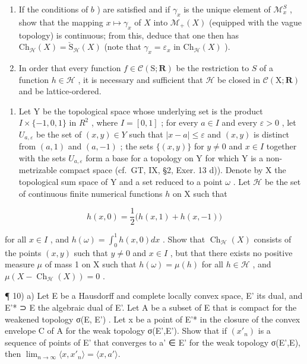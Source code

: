 \begin{enumerate}
\def\labelenumi{\alph{enumi})}
\setcounter{enumi}{2}
\item
  If the conditions of \(b\) ) are satisfied and if \(\gamma_x\) is the unique element of \(\mathcal{M}_x^S\) , show that the mapping \(x \mapsto \gamma_x\) of \(X\) into \(\mathcal{M}_+(X)\) (equipped with the vague topology) is continuous; from this, deduce that one then has \(\mathrm{Ch}_{\mathcal{H}}(X) = \check{\mathrm{S}}_{\mathcal{H}}(X)\) (note that \(\gamma_x = \varepsilon_x\) in \(\mathrm{Ch}_{\mathcal{H}}(X)\) ).
\item
  In order that every function \(f \in \mathcal{C}(\mathrm{S};\mathbf{R})\) be the restriction to \(S\) of a function \(h \in \mathcal{H}\) , it is necessary and sufficient that \(\mathcal{H}\) be closed in \(\mathcal{C}(\mathrm{X};\mathbf{R})\) and be lattice-ordered.
\end{enumerate}

\begin{enumerate}
\def\labelenumi{\arabic{enumi})}
\setcounter{enumi}{8}
\tightlist
\item
  Let Y be the topological space whose underlying set is the product \(I \times \{-1,0,1\}\) in \(R^{2}\) , where \(I = [0,1]\) ; for every \(a \in I\) and every \(\varepsilon > 0\) , let \(U_{a,\varepsilon}\) be the set of \((x,y) \in Y\) such that \(|x - a| \leqslant \varepsilon\) and \((x,y)\) is distinct from \((a,1)\) and \((a,-1)\) ; the sets \(\{(x,y)\}\) for \(y \neq 0\) and \(x \in I\) together with the sets \(U_{a,\varepsilon}\) form a base for a topology on Y for which Y is a non-metrizable compact space (cf.~GT, IX, §2, Exer. 13 d)). Denote by X the topological sum space of Y and a set reduced to a point \(\omega\) . Let \(\mathcal{H}\) be the set of continuous finite numerical functions \(h\) on X such that
\end{enumerate}

\[
h (x, 0) = \frac {1}{2} \bigl (h (x, 1) + h (x, - 1) \bigr)
\]

for all \(x \in I\) , and \(h(\omega) = \int_0^1 h(x, 0) dx\) . Show that \(\operatorname{Ch}_{\mathcal{H}}(X)\) consists of the points \((x, y)\) such that \(y \neq 0\) and \(x \in I\) , but that there exists no positive measure \(\mu\) of mass 1 on X such that \(h(\omega) = \mu(h)\) for all \(h \in \mathcal{H}\) , and \(\mu(X - \operatorname{Ch}_{\mathcal{H}}(X)) = 0\) .

¶ 10) a) Let E be a Hausdorff and complete locally convex space, E' its dual, and E'* ⊃ E the algebraic dual of E'. Let A be a subset of E that is compact for the weakened topology σ(E, E') . Let x be a point of E'* in the closure of the convex envelope C of A for the weak topology σ(E',E'). Show that if \((x'_n)\) is a sequence of points of E' that converges to a' ∈ E' for the weak topology σ(E',E), then \(\lim_{n \to \infty}\langle x, x'_n\rangle = \langle x, a'\rangle\).

